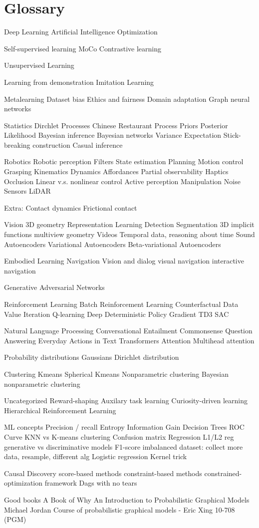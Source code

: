 \documentclass[../main.tex]{subfiles}
\begin{document}
\section{Glossary}
Deep Learning
Artificial Intelligence
Optimization

Self-supervised learning
MoCo
Contrastive learning

Unsupervised Learning

Learning from demonstration
Imitation Learning


Metalearning
Dataset bias
Ethics and fairness
Domain adaptation
Graph neural networks

Statistics
Dirchlet Processes
Chinese Restaurant Process
Priors
Posterior
Likelihood
Bayesian inference
Bayesian networks
Variance
Expectation
Stick-breaking construction
Casual inference

Robotics
Robotic perception
Filters
State estimation
Planning
Motion control
Grasping
Kinematics
Dynamics
Affordances
Partial observability
Haptics
Occlusion
Linear v.s. nonlinear control
Active perception
Manipulation
Noise
Sensors
LiDAR

Extra:
Contact dynamics
Frictional contact


Vision
3D geometry
Representation Learning
Detection
Segmentation
3D implicit functions
multiview geometry
Videos
Temporal data, reasoning about time
Sound
Autoencoders
Variational Autoencoders
Beta-variational Autoencoders

Embodied Learning
Navigation
Vision and dialog
visual navigation
interactive navigation

Generative Adversarial Networks

Reinforcement Learning
Batch Reinforcement Learning
Counterfactual Data
Value Iteration
Q-learning
Deep Deterministic Policy Gradient
TD3
SAC

Natural Language Processing
Conversational Entailment
Commonsense Question Answering
Everyday Actions in Text
Transformers
Attention
Multihead attention

Probability distributions
Gaussians
Dirichlet distribution


Clustering
Kmeans
Spherical Kmeans
Nonparametric clustering
Bayesian nonparametric clustering

Uncategorized
Reward-shaping
Auxilary task learning
Curiosity-driven learning
Hierarchical Reinforcement Learning

ML concepts
Precision / recall
Entropy
Information Gain
Decision Trees
ROC Curve
KNN vs K-means clustering
Confusion matrix
Regression
L1/L2 reg
generative vs discriminative models
F1-score
imbalanced dataset: collect more data, resample, different alg
Logistic regression
Kernel trick


Causal Discovery
score-based methods
constraint-based methods
constrained-optimization framework
Dags with no tears


Good books
A Book of Why
An Introduction to Probabilistic Graphical Models Michael Jordan
Course of probabilistic graphical models - Eric Xing 10-708 (PGM)
\end{document}
